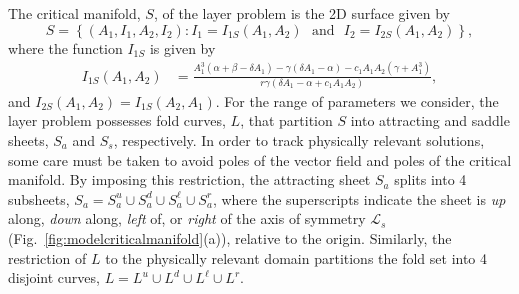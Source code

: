 \documentclass[10pt,onecolumn]{article}
\theoremstyle{plain}
\begin{document}
The critical manifold, $S$, of the layer problem is the 2D surface given by
%
\[ S = \left\{ (A_1,I_1,A_2,I_2) : I_1 = I_{1S}(A_1,A_2) \,\, \text{ and } \,\, I_2 = I_{2S}(A_1,A_2)  \right\}, \]
%
where the function $I_{1S}$ is given by 
%
\begin{align*} 
I_{1S}(A_1,A_2) &= \frac{A_1^3(\alpha+\beta-\delta A_1)-\gamma(\delta A_1-\alpha)-c_1 A_1 A_2(\gamma+A_1^3)}{r \gamma \left( \delta A_1 - \alpha+c_1 A_1 A_2 \right)}, 
\end{align*}
%
and $I_{2S}(A_1,A_2) = I_{1S}(A_2,A_1)$.
For the range of parameters we consider, the layer problem possesses fold curves, $L$, that partition $S$ into attracting and saddle sheets, $S_a$ and $S_s$, respectively. 
In order to track physically relevant solutions, some care must be taken to avoid poles of the vector field and poles of the critical manifold. 
By imposing this restriction, the attracting sheet $S_a$ splits into 4 subsheets, $S_a = S_a^u \cup S_a^d \cup S_a^{\ell} \cup S_a^r$, where the superscripts indicate the sheet is {\em up} along, {\em down} along, {\em left} of, or {\em right} of the axis of symmetry $\mathcal L_s$ (Fig.~\ref{fig:modelcriticalmanifold}(a)), relative to the origin. 
Similarly, the restriction of $L$ to the physically relevant domain partitions the fold set into 4 disjoint curves, $L = L^u \cup L^d \cup L^{\ell} \cup L^r$.
\end{document}

